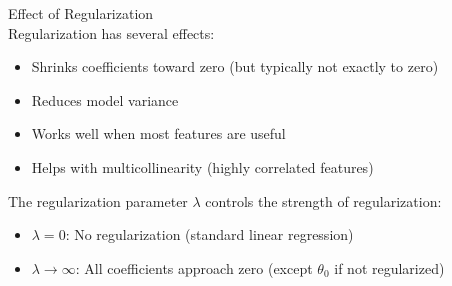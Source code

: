 \begin{concept}{Effect of Regularization}\\
Regularization has several effects:
\begin{itemize}
    \item Shrinks coefficients toward zero (but typically not exactly to zero)
    \item Reduces model variance
    \item Works well when most features are useful
    \item Helps with multicollinearity (highly correlated features)
\end{itemize}
The regularization parameter $\lambda$ controls the strength of regularization:
\begin{itemize}
    \item $\lambda = 0$: No regularization (standard linear regression)
    \item $\lambda \to \infty$: All coefficients approach zero (except $\theta_0$ if not regularized)
\end{itemize}
\end{concept}

